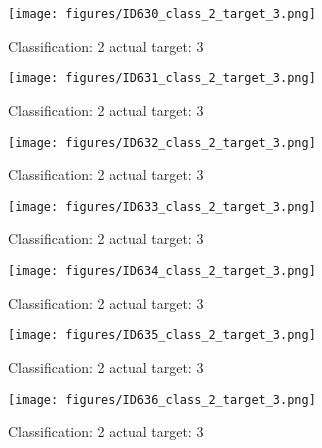 \begin{figure}[h!]
\begin{center}
\texttt{[image: figures/ID630\_class\_2\_target\_3.png]}
\end{center}
\caption{ Classification: 2 actual target: 3}
\label{fig:ID630_class_2_target_3}
\end{figure}
\begin{figure}[h!]
\begin{center}
\texttt{[image: figures/ID631\_class\_2\_target\_3.png]}
\end{center}
\caption{ Classification: 2 actual target: 3}
\label{fig:ID631_class_2_target_3}
\end{figure}
\begin{figure}[h!]
\begin{center}
\texttt{[image: figures/ID632\_class\_2\_target\_3.png]}
\end{center}
\caption{ Classification: 2 actual target: 3}
\label{fig:ID632_class_2_target_3}
\end{figure}
\begin{figure}[h!]
\begin{center}
\texttt{[image: figures/ID633\_class\_2\_target\_3.png]}
\end{center}
\caption{ Classification: 2 actual target: 3}
\label{fig:ID633_class_2_target_3}
\end{figure}
\begin{figure}[h!]
\begin{center}
\texttt{[image: figures/ID634\_class\_2\_target\_3.png]}
\end{center}
\caption{ Classification: 2 actual target: 3}
\label{fig:ID634_class_2_target_3}
\end{figure}
\begin{figure}[h!]
\begin{center}
\texttt{[image: figures/ID635\_class\_2\_target\_3.png]}
\end{center}
\caption{ Classification: 2 actual target: 3}
\label{fig:ID635_class_2_target_3}
\end{figure}
\begin{figure}[h!]
\begin{center}
\texttt{[image: figures/ID636\_class\_2\_target\_3.png]}
\end{center}
\caption{ Classification: 2 actual target: 3}
\label{fig:ID636_class_2_target_3}
\end{figure}
